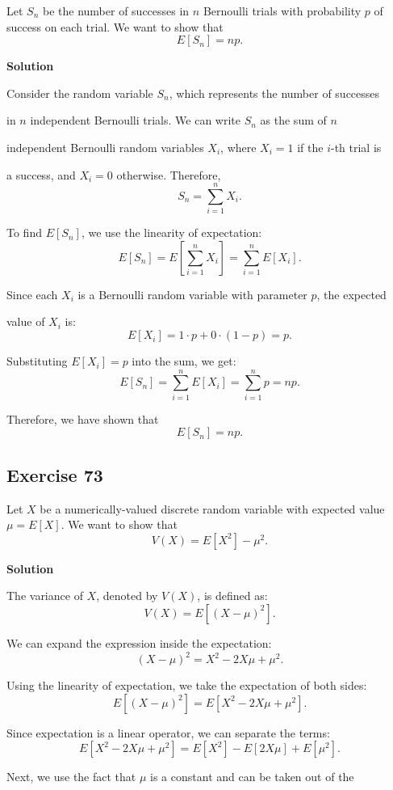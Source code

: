 \documentclass{article}
\begin{document}
Let \( S_n \) be the number of successes in \( n \) Bernoulli trials with probability \( p \) of success on each trial. We want to show that
\[
E[S_n] = np.
\]

\textbf{Solution}

Consider the random variable \( S_n \), which represents the number of successes 

in \( n \) independent Bernoulli trials. We can write \( S_n \) as the sum of \( n \) 

independent Bernoulli random variables \( X_i \), where \( X_i = 1 \) if the \( i \)-th trial is 

a success, and \( X_i = 0 \) otherwise. Therefore,
\[
S_n = \sum_{i=1}^n X_i.
\]

To find \( E[S_n] \), we use the linearity of expectation:
\[
E[S_n] = E\left[ \sum_{i=1}^n X_i \right] = \sum_{i=1}^n E[X_i].
\]

Since each \( X_i \) is a Bernoulli random variable with parameter \( p \), the expected 

value of \( X_i \) is:
\[
E[X_i] = 1 \cdot p + 0 \cdot (1-p) = p.
\]

Substituting \( E[X_i] = p \) into the sum, we get:
\[
E[S_n] = \sum_{i=1}^n E[X_i] = \sum_{i=1}^n p = np.
\]

Therefore, we have shown that
\[
E[S_n] = np.
\]

\subsection*{Exercise 73}

Let \(X\) be a numerically-valued discrete random variable with expected value \(\mu = E[X]\). We want to show that
\[
V(X) = E[X^2] - \mu^2.
\]

\textbf{Solution}

The variance of \(X\), denoted by \(V(X)\), is defined as:
\[
V(X) = E[(X - \mu)^2].
\]

We can expand the expression inside the expectation:
\[
(X - \mu)^2 = X^2 - 2X\mu + \mu^2.
\]

Using the linearity of expectation, we take the expectation of both sides:
\[
E[(X - \mu)^2] = E[X^2 - 2X\mu + \mu^2].
\]

Since expectation is a linear operator, we can separate the terms:
\[
E[X^2 - 2X\mu + \mu^2] = E[X^2] - E[2X\mu] + E[\mu^2].
\]

Next, we use the fact that \(\mu\) is a constant and can be taken out of the 
\end{document}
